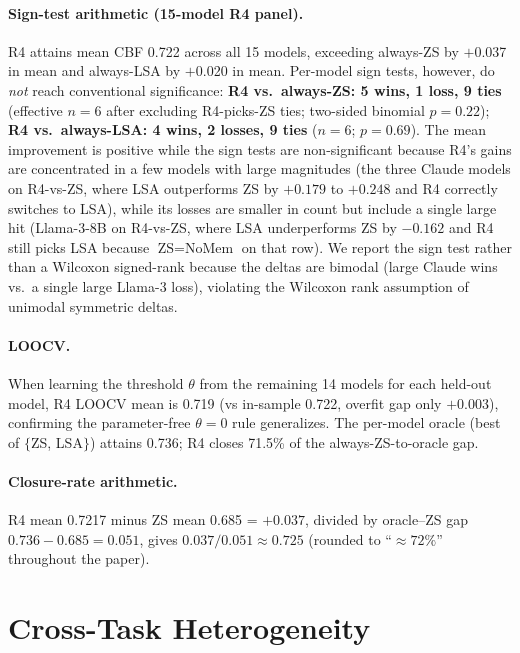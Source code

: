 \documentclass[11pt]{article}
\begin{document}
\paragraph{Sign-test arithmetic (15-model R4 panel).} R4 attains mean CBF 0.722 across all 15 models, exceeding always-ZS by $+$0.037 in mean and always-LSA by $+$0.020 in mean. Per-model sign tests, however, do \emph{not} reach conventional significance: \textbf{R4 vs.\ always-ZS: 5 wins, 1 loss, 9 ties} (effective $n=6$ after excluding R4-picks-ZS ties; two-sided binomial $p=0.22$); \textbf{R4 vs.\ always-LSA: 4 wins, 2 losses, 9 ties} ($n=6$; $p=0.69$). The mean improvement is positive while the sign tests are non-significant because R4's gains are concentrated in a few models with large magnitudes (the three Claude models on R4-vs-ZS, where LSA outperforms ZS by $+0.179$ to $+0.248$ and R4 correctly switches to LSA), while its losses are smaller in count but include a single large hit (Llama-3-8B on R4-vs-ZS, where LSA underperforms ZS by $-0.162$ and R4 still picks LSA because $\text{ZS}=\text{NoMem}$ on that row). We report the sign test rather than a Wilcoxon signed-rank because the deltas are bimodal (large Claude wins vs.\ a single large Llama-3 loss), violating the Wilcoxon rank assumption of unimodal symmetric deltas.

\paragraph{LOOCV.} When learning the threshold $\theta$ from the remaining 14 models for each held-out model, R4 LOOCV mean is 0.719 (vs in-sample 0.722, overfit gap only $+$0.003), confirming the parameter-free $\theta=0$ rule generalizes. The per-model oracle (best of $\{$ZS, LSA$\}$) attains 0.736; R4 closes 71.5\% of the always-ZS-to-oracle gap.

\paragraph{Closure-rate arithmetic.} R4 mean 0.7217 minus ZS mean 0.685 = $+0.037$, divided by oracle--ZS gap $0.736-0.685 = 0.051$, gives $0.037/0.051 \approx 0.725$ (rounded to ``$\approx 72\%$'' throughout the paper).



\section{Cross-Task Heterogeneity}
\label{app:group_f}
\end{document}
